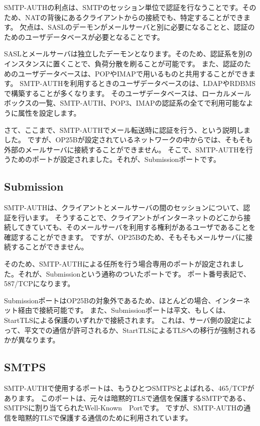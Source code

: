 SMTP-AUTHの利点は、SMTPのセッション単位で認証を行なうことです。そのため、NATの背後にあるクライアントからの接続でも、特定することができます。
欠点は、SASLのデーモンがメールサーバと別に必要になることと、認証のためのユーザデータベースが必要となることです。

SASLとメールサーバは独立したデーモンとなります。そのため、認証系を別のインスタンスに置くことで、負荷分散を刷ることが可能です。
また、認証のためのユーザデータベースは、POPやIMAPで用いるものと共用することができます。
SMTP-AUTHを利用するときのユーザデータベースのは、LDAPやRDBMSで構築することが多くなります。
そのユーザデータベースは、ローカルメールボックスの一覧、SMTP-AUTH、POP3、IMAPの認証系の全てで利用可能なように属性を設定します。

さて、ここまで、SMTP-AUTHでメール転送時に認証を行う、という説明しました。
ですが、OP25Bが設定されているネットワークの中からでは、そもそも外部のメールサーバに接続することができません。
そこで、SMTP-AUTHを行うためのポートが設定されました。それが、Submissionポートです。

\subsection{Submission}

SMTP-AUTHは、クライアントとメールサーバの間のセッションについて、認証を行います。
そうすることで、クライアントがインターネットのどこから接続してきていても、そのメールサーバを利用する権利があるユーザであることを確認することができます。
ですが、OP25Bのため、そもそもメールサーバに接続することができません。

そのため、SMTP-AUTHによる任所を行う場合専用のポートが設定されました。それが、Submissionという通称のついたポートです。
ポート番号表記で、587/TCPになります。

SubmissionポートはOP25Bの対象外であるため、ほとんどの場合、インターネット経由で接続可能です。
また、Submissionポートは平文、もしくは、StartTLSによる保護のいずれかで接続されます。
これは、サーバ側の設定によって、平文での通信が許可されるか、StartTLSによるTLSへの移行が強制されるかが異なります。

\subsection{SMTPS}

SMTP-AUTHで使用するポートは、もうひとつSMTPSとよばれる、465/TCPがあります。
このポートは、元々は暗黙的TLSで通信を保護するSMTPである、SMTPSに割り当てられたWell-Known　Portです。
ですが、SMTP-AUTHの通信を暗黙的TLSで保護する通信のために利用されています。

